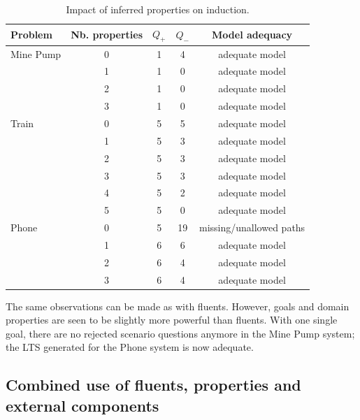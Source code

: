 \begin{table}[H]
\centering
\begin{tabular}{|l||c||c|c|c|}\hline
Problem   & Nb. properties &$Q_+$&$Q_-$& Model adequacy\\\hline\hline
Mine Pump & 0              & 1   & 4   & adequate model\\\cline{2-5}
          & 1              & 1   & 0   & adequate model\\\cline{2-5}
          & 2              & 1   & 0   & adequate model\\\cline{2-5}
          & 3              & 1   & 0   & adequate model\\\hline\hline
Train     & 0              & 5   & 5   & adequate model\\\cline{2-5}
          & 1              & 5   & 3   & adequate model\\\cline{2-5}
          & 2              & 5   & 3   & adequate model\\\cline{2-5}
          & 3              & 5   & 3   & adequate model\\\cline{2-5}
          & 4              & 5   & 2   & adequate model\\\cline{2-5}
          & 5              & 5   & 0   & adequate model\\\hline\hline
Phone     & 0              & 5   & 19  & missing/unallowed paths\\\cline{2-5}
          & 1              & 6   & 6   & adequate model\\\cline{2-5}
          & 2              & 6   & 4   & adequate model\\\cline{2-5}
          & 3              & 6   & 4   & adequate model\\\hline
\end{tabular}
\caption{Impact of inferred properties on induction.\label{Properties:res}}
\end{table}

The same observations can be made as with fluents. However, goals and domain properties are seen to be slightly more powerful than fluents. With one single goal, there are no rejected scenario questions anymore in the Mine Pump system; the LTS generated for the Phone system is now adequate.


\subsection{Combined use of fluents, properties and external components}

